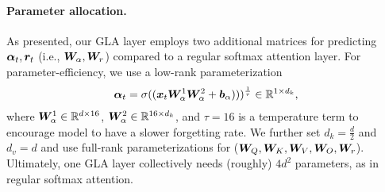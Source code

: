 \paragraph{Parameter allocation.}  As presented, our GLA layer employs two additional matrices  for predicting ${\bm{\alpha}}_t, {\bm{r}}_t$ (i.e., ${\bm{W}}_\alpha, {\bm{W}}_r$) compared to a regular softmax attention layer. %
%
For parameter-efficiency, we use a low-rank parameterization 
\begin{align*}
   {\bm{\alpha}}_t = \sigma(({\bm{x}}_t {\bm{W}}^1_\alpha {\bm{W}}^2_\alpha + {\bm{b}}_\alpha)))^{\frac{1}{\tau}}   \in \mathbb{R}^{1 \times d_k},
\end{align*}
where ${\bm{W}}^1_\alpha \in \mathbb{R}^{d \times 16}$, ${\bm{W}}^2_\alpha \in \mathbb{R}^{16 \times d_k}$, and $\tau = 16$ is a temperature term to encourage model to have a slower forgetting rate. 
We further set $d_k = \frac{d}{2}$ and $d_v = d$ and use  full-rank parameterizations for (${\bm{W}}_Q, {\bm{W}}_K, {\bm{W}}_V, {\bm{W}}_O, {\bm{W}}_r$). 
%
Ultimately, one GLA layer collectively needs (roughly) $4d^2$ parameters, as in regular softmax attention. 

%
%
%
%
%
%
%
%
%